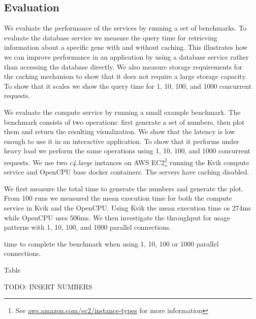 \subsection*{Evaluation} 
We evaluate the performance of the services by running a set of benchmarks. To
evaluate the database service we measure the query time for retrieving
information about a specific gene with and without caching. This illustrates how
we can improve performance in an application by using a database service rather
than accessing the database directly. We also measure storage requirements for
the caching mechanism to show that it does not require a large storage capacity.
To show that it scales we show the query time for 1, 10, 100, and 1000
concurrent requests.

We evaluate the compute service by running a small example benchmark. The
benchmark consists of two operations: first generate a
set of numbers, then plot them and return the resulting visualization. We show
that the latency is low enough to use it in an interactive application. To show
that it performs under heavy load we perform the same operations using 1, 10,
100, and 1000 concurrent requests. We use two \emph{c4.large} instances on AWS
EC2\footnote{See \url{aws.amazon.com/ec2/instance-types} for more
information} running the Kvik compute service and OpenCPU base docker
containers. The servers have caching disabled. 

We first measure the total time to generate the numbers and generate the plot.
From 100 runs we measured the mean execution time for both the compute service
in Kvik and the OpenCPU. Using Kvik the mean execution time os 274ms while
OpenCPU uses 506ms. We then investigate the throughput for usage patterns with
1, 10, 100, and 1000 parallel connections. 

time to complete the benchmark when
using 1, 10, 100 or 1000 parallel connections. 

Table 

TODO: INSERT NUMBERS
